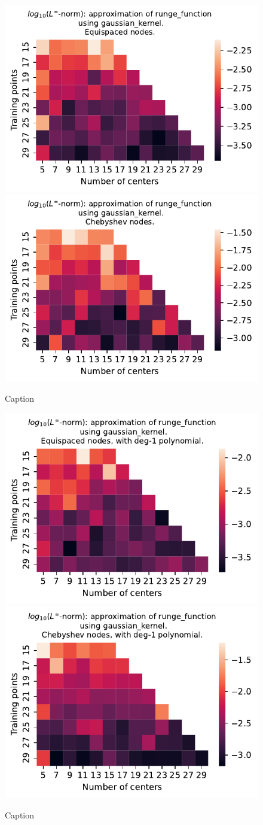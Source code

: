 \documentclass[12pt]{report} %
\begin{document}
\begin{figure}[ht]
    \centering
    
    \includegraphics[width=.49\textwidth]{imagenes/experiments/1d/variational/runge_function-Kgaussian_kernel-Equi.pdf}
    \includegraphics[width=.49\textwidth]{imagenes/experiments/1d/variational/runge_function-Kgaussian_kernel-Cheb.pdf}
    \caption{Caption}
    \label{fig:runge-gaussian}
\end{figure}


\begin{figure}[ht]
    \centering
    
    \includegraphics[width=.49\textwidth]{imagenes/experiments/1d/variational/runge_function-Kgaussian_kernel-Poly-Equi.pdf}
    \includegraphics[width=.49\textwidth]{imagenes/experiments/1d/variational/runge_function-Kgaussian_kernel-Poly-Cheb.pdf}
    \caption{Caption}
    \label{fig:runge-gaussian-poly}
\end{figure}
\end{document}

